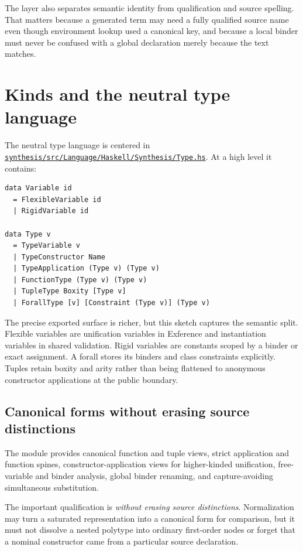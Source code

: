 \documentclass[10pt,letterpaper,oneside]{report}
\def\DjexBase{https://github.com/VladimirReshetnikov/Djex/blob/d3d9662598460316bdcd177ce6768c521e764aa8/}
\newcommand{\dpath}[1]{\href{\DjexBase#1}{\nolinkurl{#1}}}
\begin{document}
The layer also separates semantic identity from qualification and source spelling. That matters because a generated term may need a fully qualified source name even though environment lookup used a canonical key, and because a local binder must never be confused with a global declaration merely because the text matches.

\section{Kinds and the neutral type language}

The neutral type language is centered in \dpath{synthesis/src/Language/Haskell/Synthesis/Type.hs}. At a high level it contains:

\begin{lstlisting}[language=Haskellish]
data Variable id
  = FlexibleVariable id
  | RigidVariable id

data Type v
  = TypeVariable v
  | TypeConstructor Name
  | TypeApplication (Type v) (Type v)
  | FunctionType (Type v) (Type v)
  | TupleType Boxity [Type v]
  | ForallType [v] [Constraint (Type v)] (Type v)
\end{lstlisting}

The precise exported surface is richer, but this sketch captures the semantic split. Flexible variables are unification variables in Exference and instantiation variables in shared validation. Rigid variables are constants scoped by a binder or exact assignment. A forall stores its binders and class constraints explicitly. Tuples retain boxity and arity rather than being flattened to anonymous constructor applications at the public boundary.

\subsection{Canonical forms without erasing source distinctions}

The module provides canonical function and tuple views, strict application and function spines, constructor-application views for higher-kinded unification, free-variable and binder analysis, global binder renaming, and capture-avoiding simultaneous substitution.

The important qualification is \emph{without erasing source distinctions}. Normalization may turn a saturated representation into a canonical form for comparison, but it must not dissolve a nested polytype into ordinary first-order nodes or forget that a nominal constructor came from a particular source declaration.
\end{document}
